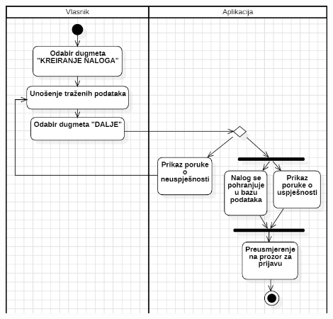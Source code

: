 \documentclass{scrreprt}
\begin{document}
\begin{center}
	\includegraphics[width=12cm]{./img/01.png}
\end{center}
\end{document}
